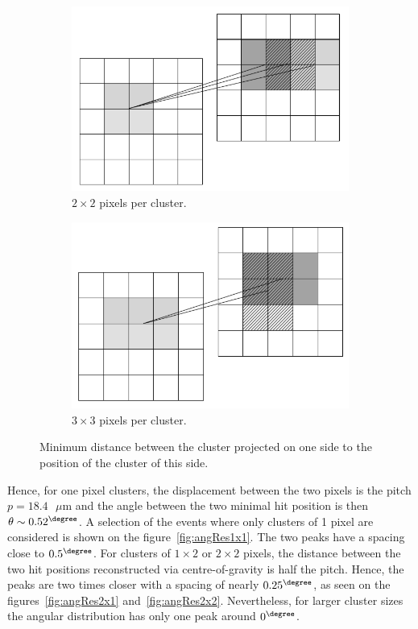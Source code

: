 \begin{figure}[!h]
      \begin{subfigure}[t]{0.45\textwidth}
        \centering
        \includegraphics[width = \textwidth]{Pictures/deformation/cluster_2x2.png}
        \caption{$2 \times 2$ pixels per cluster.}
      \end{subfigure}
      \quad
      \begin{subfigure}[t]{0.45\textwidth}
        \centering
        \includegraphics[width = \textwidth]{Pictures/deformation/cluster_3x3.png}
        \caption{$3 \times 3$ pixels per cluster.}
      \end{subfigure}
      \caption{Minimum distance between the cluster projected on one side to the position of the cluster of this side.}
      \label{fig:clusterSize}
   \end{figure}

   Hence, for one pixel clusters, the displacement between the two pixels is the pitch $p = 18.4 \text{ }\mu\text{m}$ and the angle between the two minimal hit position is then $\theta \sim 0.52^{\degree}$.
   A selection of the events where only clusters of 1 pixel are considered is shown on the figure~\ref{fig:angRes1x1}.
   The two peaks have a spacing close to $0.5^{\degree}$.
   For clusters of $1 \times 2$ or $2 \times 2$ pixels, the distance between the two hit positions reconstructed via centre-of-gravity is half the pitch.
   Hence, the peaks are two times closer with a spacing of nearly $0.25^{\degree}$, as seen on the figures~\ref{fig:angRes2x1} and~\ref{fig:angRes2x2}.
   Nevertheless, for larger cluster sizes the angular distribution has only one peak around $0^{\degree}$.


